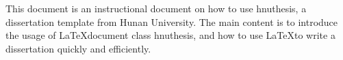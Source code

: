 \begin{abstract} %
	本文是湖南大学学位论文模板hnuthesis的使用说明文档。主要内容为介绍\LaTeX{}文档类hnuthesis的用法，以及如何使用\LaTeX{}快速高效地撰写学位论文。	
	
\end{abstract}

\begin{enabstract}
	This document is an instructional document on how to use hnuthesis, a dissertation template from Hunan University. The main content is to introduce the usage of \LaTeX{}document class hnuthesis, and how to use \LaTeX{}to write a dissertation quickly and efficiently.
\end{enabstract}